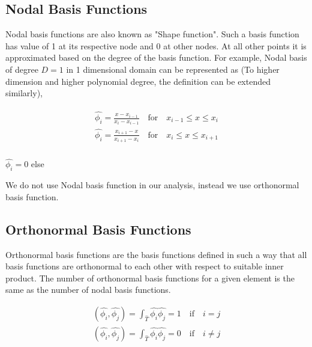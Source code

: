 \documentclass[a4paper,12pt]{book}
\begin{document}
\subsection{Nodal Basis Functions}

Nodal basis functions are also known as "Shape function". Such a basis function has value of 1 at its respective node and 0 at other nodes. At all other points it is approximated based on the degree of the basis function. 
For example, Nodal basis of degree $D=1$ in 1 dimensional domain can be represented as (To higher dimension and higher polynomial degree, the definition can be extended similarly),

\begin{equation}
\begin{aligned}
\begin{split}
\hat{\phi_i} = \frac{x-x_{i-1}}{x_i-x_{i-1}} \quad \textrm{for} \quad x_{i-1} \leq x \leq x_i\\
\hat{\phi_i} = \frac{x_{i+1}-x}{x_{i+1}-x_{i}} \quad \textrm{for} \quad x_{i} \leq x \leq x_{i+1}\\
\end{split}
\end{aligned}
\end{equation}
\begin{center}
$\hat{\phi_i} = 0$ else
\end{center}

We do not use Nodal basis function in our analysis, instead we use orthonormal basis function.

\subsection{Orthonormal Basis Functions}

Orthonormal basis functions are the basis functions defined in such a way that all basis functions are orthonormal to each other with respect to suitable inner product. The number of orthonormal basis functions for a given element is the same as the number of nodal basis functions. 

\begin{equation}
\begin{split}
(\hat{\phi_i } , \hat{\phi_j}) = \int_{\hat{T}} \hat{\phi_i} \hat{\phi_j} = 1 \quad \textrm{if} \quad i = j \\
(\hat{\phi_i } , \hat{\phi_j}) = \int_{\hat{T}} \hat{\phi_i} \hat{\phi_j} = 0 \quad \textrm{if} \quad i \neq j 
\end{split}
\end{equation}
\end{document}
